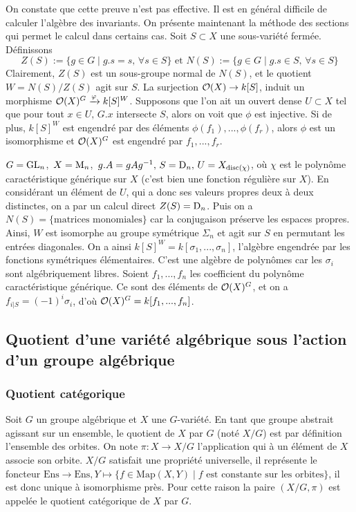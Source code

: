 On constate que cette preuve n'est pas effective. Il est en général difficile de calculer l'algèbre des invariants. On présente maintenant la méthode des sections qui permet le calcul dans certains cas. Soit $S\subset X$ une sous-variété fermée. Définissons 
$$Z(S):=\lbrace g\in G\mid g.s=s,\,\forall s \in S\rbrace\text{ et }N(S):=\lbrace g\in G\mid g.s\in S,\,\forall s \in S\rbrace$$
Clairement, $Z(S)$ est un sous-groupe normal de $N(S)$, et le quotient $W=N(S)/Z(S)$ agit sur $S$. La surjection $\mathcal{O}(X)\rightarrow k[S]$, induit un morphisme $\mathcal{O}(X)^G\xrightarrow{\varphi} k[S]^W$. Supposons que l'on ait un ouvert dense $U\subset X$ tel que pour tout $x\in U,\, G.x$ intersecte $S$, alors on voit que $\phi$ est injective. Si de plus, $k[S]^W$ est engendré par des éléments $\phi(f_1),...,\phi(f_r)$, alors $\phi$ est un isomorphisme et $\mathcal{O}(X)^G$ est engendré par $f_1,...,f_r$.

\begin{ex}
$G=\operatorname{GL}_n$,\, $X=\operatorname{M}_n$,\, $g.A=gAg^{-1},\, S=\operatorname{D}_n,\, U=X_{\operatorname{disc}(\chi )}$, où $\chi$ est le polynôme caractéristique générique sur $X$ (c'est bien une fonction régulière sur $X$). En considérant un élément de $U$, qui a donc ses valeurs propres deux à deux distinctes, on a par un calcul direct $Z(S)=\operatorname{D}_n$. Puis on a $N(S)=\lbrace\textrm{matrices monomiales}\rbrace$ car la conjugaison préserve les espaces propres. Ainsi, $W$ est isomorphe au groupe symétrique $\Sigma_n$ et agit sur $S$ en permutant les entrées diagonales. On a ainsi $k[S]^W=k[\sigma_1,...,\sigma _n]$, l'algèbre engendrée par les fonctions symétriques élémentaires. C'est une algèbre de polynômes car les $\sigma_i$ sont algébriquement libres. Soient $f_1,...,f_n$ les coefficient du polynôme caractéristique générique. Ce sont des éléments de $\mathcal{O}(X)^G$, et on a $f_{i| S}=(-1)^i\sigma _i$, d'où $\mathcal{O}(X)^G=k[f_1,...,f_n]$.
\end{ex}

\subsection{Quotient d'une variété algébrique sous l'action d'un groupe algébrique}

\subsubsection{Quotient catégorique}

Soit $G$ un groupe algébrique et $X$ une $G$-variété. En tant que groupe abstrait agissant sur un ensemble, le quotient de $X$ par $G$ (noté $X/G$) est par définition l'ensemble des orbites. On note $\pi:X \rightarrow X/G$ l'application qui à un élément de $X$ associe son orbite. $X/G$ satisfait une propriété universelle, il représente le foncteur $\textrm{Ens}\rightarrow \textrm{Ens}, Y\mapsto \lbrace f\in \textrm{Map}(X, Y)\mid f \textrm{ est constante sur les orbites} \rbrace$, il est donc unique à isomorphisme près. Pour cette raison la paire $(X
/G, \pi)$ est appelée le quotient catégorique de $X$ par $G$.

